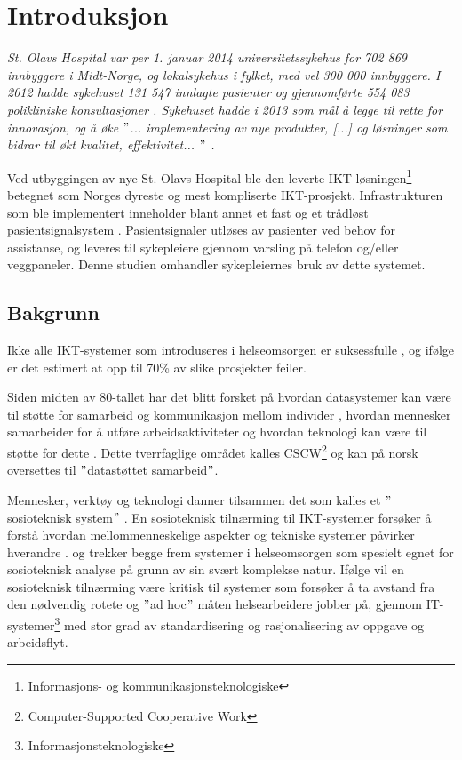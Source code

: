 \chapter{Introduksjon}
\label{chp:introduksjon}
\textit{St. Olavs Hospital var per 1. januar 2014 universitetssykehus for 702 869 innbyggere i Midt-Norge, og lokalsykehus i fylket, med vel 300 000 innbyggere. I 2012 hadde sykehuset 131 547 innlagte pasienter og gjennomførte 554 083 polikliniske konsultasjoner \citep{stolavs}. Sykehuset hadde i 2013 som mål å legge til rette for innovasjon, og å øke $"$... implementering av nye produkter, [...] og løsninger som bidrar til økt kvalitet, effektivitet... $"$ \citep{styring13}.}

\noindent
Ved utbyggingen av nye St. Olavs Hospital ble den leverte IKT-løsningen\footnote{Informasjons- og kommunikasjonsteknologiske} betegnet som Norges dyreste og mest kompliserte IKT-prosjekt. Infrastrukturen som ble implementert inneholder blant annet et fast og et trådløst pasientsignalsystem \citep{TU}. Pasientsignaler utløses av pasienter ved behov for assistanse, og leveres til sykepleiere gjennom varsling på telefon og/eller veggpaneler. Denne studien omhandler sykepleiernes bruk av dette systemet.

\section{Bakgrunn}
Ikke alle IKT-systemer som introduseres i helseomsorgen er suksessfulle \citep{Coiera07}, og ifølge \citet{FITT} er det estimert at opp til 70\% av slike prosjekter feiler.

\noindent
Siden midten av 80-tallet har det blitt forsket på hvordan datasystemer kan være til støtte for samarbeid og kommunikasjon mellom individer \citep{Rogers94}, hvordan mennesker samarbeider for å utføre arbeidsaktiviteter og hvordan teknologi kan være til støtte for dette \citep{Ellis91}. Dette tverrfaglige området kalles CSCW\footnote{Computer-Supported Cooperative Work} og kan på norsk oversettes til $"$datastøttet samarbeid$"$. 

\noindent
Mennesker, verktøy og teknologi danner tilsammen det som kalles et $"$sosioteknisk system$"$ \citep{Coiera04}. En sosioteknisk tilnærming til IKT-systemer forsøker å forstå hvordan mellommenneskelige aspekter og tekniske systemer påvirker hverandre \citep{Coiera04}. \citet{Coiera07} og \citet{Berg99} trekker begge frem systemer i helseomsorgen som spesielt egnet for sosioteknisk analyse på grunn av sin svært komplekse natur. Ifølge \citet{Berg99} vil en sosioteknisk tilnærming være kritisk til systemer som forsøker å ta avstand fra den nødvendig rotete og $"$ad hoc$"$ måten helsearbeidere jobber på, gjennom IT-systemer\footnote{Informasjonsteknologiske} med stor grad av standardisering og rasjonalisering av oppgave og arbeidsflyt.


